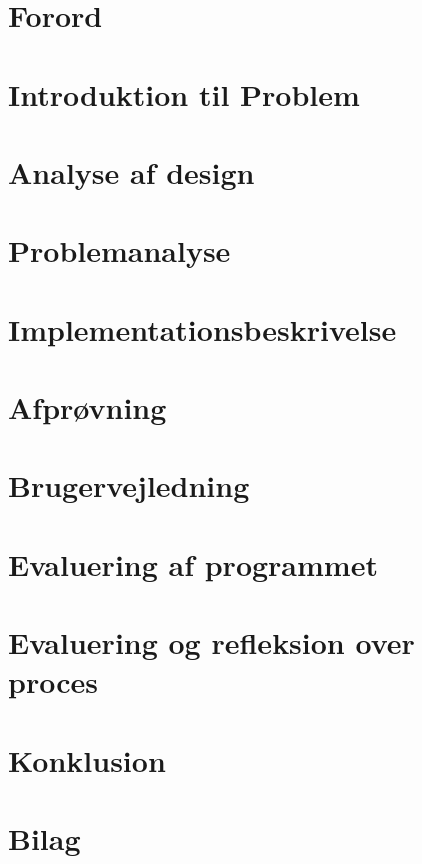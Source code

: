 



	\tableofcontents* %
	\newpage

	\chapter{Forord}
	

	\chapter{Introduktion til Problem}
	

	\chapter{Analyse af design}
	

	\chapter{Problemanalyse}
	

	\chapter{Implementationsbeskrivelse}
	

	\chapter{Afprøvning}
	

	\chapter{Brugervejledning}
	

	\chapter{Evaluering af programmet}
	

	\chapter{Evaluering og refleksion over proces}
	

	\chapter{Konklusion}
	

	\chapter{Bilag}
	

